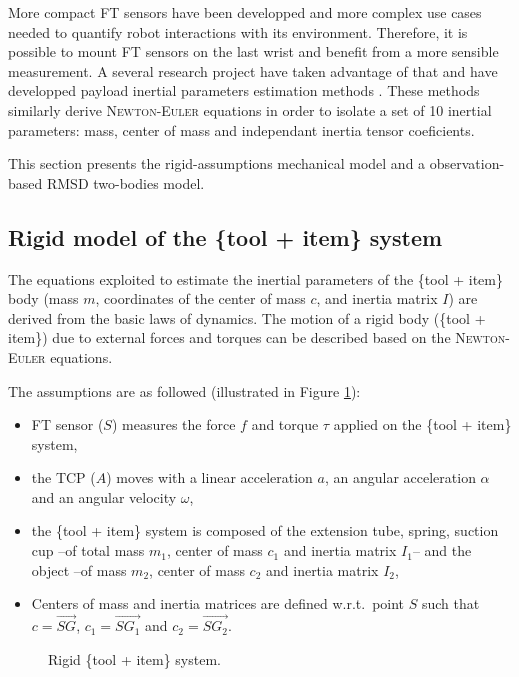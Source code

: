 \documentclass[/home/francois/latex/report/main.tex]{subfiles}
\begin{document}
More compact \ac{FT} sensors have been developped and more complex use cases needed to quantify robot interactions with its environment. Therefore, it is possible to mount \ac{FT} sensors on the last wrist and benefit from a more sensible measurement. A several research project have taken advantage of that and have developped payload inertial parameters estimation methods \cite{Kubus2008, Kubus2007, Kubus2014, Farsoni2018}. These methods similarly derive \textsc{Newton-Euler} equations in order to isolate a set of 10 inertial parameters: mass, center of mass and independant inertia tensor coeficients.

This section presents the rigid-assumptions mechanical model and a observation-based \ac{RMSD} two-bodies model.

\subsection{Rigid model of the \{tool + item\} system}

The equations exploited to estimate the inertial parameters of the \{tool + item\} body (mass $m$, coordinates of the center of mass $c$, and inertia matrix $I$) are derived from the basic laws of dynamics. The motion of a rigid body (\{tool + item\}) due to external forces and torques can be described based on the \textsc{Newton-Euler} equations.

The assumptions are as followed (illustrated in Figure \ref{fig:tikz:one_body}):

\begin{itemize}
 \item \ac{FT} sensor ($S$) measures the force $f$ and torque $\tau$ applied on the \{tool + item\} system,
 \item the \ac{TCP} ($A$) moves with a linear acceleration $a$, an angular acceleration $\alpha$ and an angular velocity $\omega$,
 \item the \{tool + item\} system is composed of the extension tube, spring, suction cup –of total mass $m_1$, center of mass $c_1$ and inertia matrix $I_1$– and the object –of mass $m_2$, center of mass $c_2$ and inertia matrix $I_2$,
 \item Centers of mass and inertia matrices are defined w.r.t.\ point $S$ such that $c = \overrightarrow{SG}$, $c_1 = \overrightarrow{SG_1}$ and $c_2 = \overrightarrow{SG_2}$.
\end{itemize}

\begin{figure}
\centering
   \caption{Rigid \{tool + item\} system.}
   \label{fig:tikz:one_body}
\end{figure}
\end{document}
